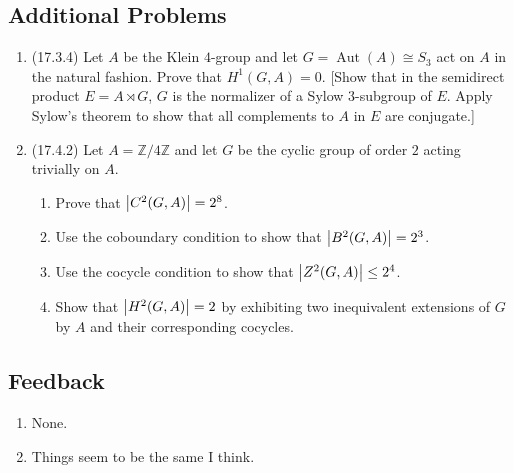 \documentclass[11pt]{article}
\DeclareMathOperator\Aut{Aut}
\begin{document}
\subsection*{Additional Problems}
\begin{enumerate}
    \item (17.3.4) Let $A$ be the Klein $4$-group and let $G = \Aut(A)\cong S_3$ act on $A$ in the natural fashion. Prove that $H^1(G,A) = 0$. [Show that in the semidirect product $E = A\rtimes G$, $G$ is the normalizer of a Sylow $3$-subgroup of $E$. Apply Sylow's theorem to show that all complements to $A$ in $E$ are conjugate.]
    \item (17.4.2) Let $A=\mathbb{Z}/4\mathbb{Z}$ and let $G$ be the cyclic group of order $2$ acting trivially on $A$.\begin{enumerate}
        \item Prove that $\abs{C^2(G,A)} = 2^8$.
        \item Use the coboundary condition to show that $\abs{B^2(G,A)} = 2^3$.
        \item Use the cocycle condition to show that $\abs{Z^2(G,A)} \leq 2^4$. 
        \item Show that $\abs{H^2(G,A)} = 2$ by exhibiting two inequivalent extensions of $G$ by $A$ and their corresponding cocycles.
    \end{enumerate}
\end{enumerate}
\subsection*{Feedback}
\begin{enumerate}
    \item None.
    \item Things seem to be the same I think.
\end{enumerate}
\end{document}
